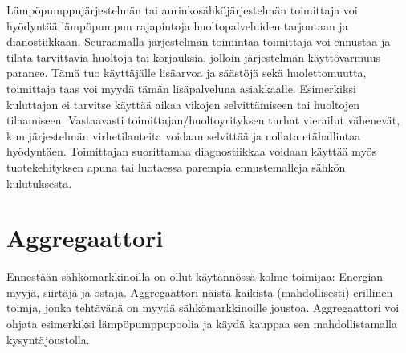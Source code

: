   Lämpöpumppujärjestelmän tai aurinkosähköjärjestelmän toimittaja voi hyödyntää lämpöpumpun rajapintoja huoltopalveluiden tarjontaan ja dianostiikkaan. Seuraamalla järjestelmän toimintaa toimittaja voi ennustaa ja tilata tarvittavia huoltoja tai korjauksia, jolloin järjestelmän käyttövarmuus paranee. Tämä tuo käyttäjälle lisäarvoa ja säästöjä sekä huolettomuutta, toimittaja taas voi myydä tämän lisäpalveluna asiakkaalle. Esimerkiksi kuluttajan ei tarvitse käyttää aikaa vikojen selvittämiseen tai huoltojen tilaamiseen. Vastaavasti toimittajan/huoltoyrityksen turhat vierailut vähenevät, kun järjestelmän virhetilanteita voidaan selvittää ja nollata etähallintaa hyödyntäen. Toimittajan suorittamaa diagnostiikkaa voidaan käyttää myös tuotekehityksen apuna tai luotaessa parempia ennustemalleja sähkön kulutuksesta.

\section{Aggregaattori}

  Ennestään sähkömarkkinoilla on ollut käytännössä kolme toimijaa: Energian myyjä, siirtäjä ja ostaja. Aggregaattori näistä kaikista (mahdollisesti) erillinen toimja, jonka tehtävänä on myydä sähkömarkkinoille joustoa. Aggregaattori voi ohjata esimerkiksi lämpöpumppupoolia ja käydä kauppaa sen mahdollistamalla kysyntäjoustolla.
